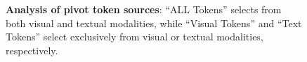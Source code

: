 \begin{figure}[!h]
    \vspace{-3mm}
    \centering
    \vspace{-3mm}
    \caption{
    \textbf{Analysis of pivot token sources}: ``ALL Tokens'' selects from both visual and textual modalities, while ``Visual Tokens'' and ``Text Tokens'' select exclusively from visual or textual modalities, respectively.}
    \vspace{-5mm}
    
    \label{fig:pivot_tokens}
\end{figure}

